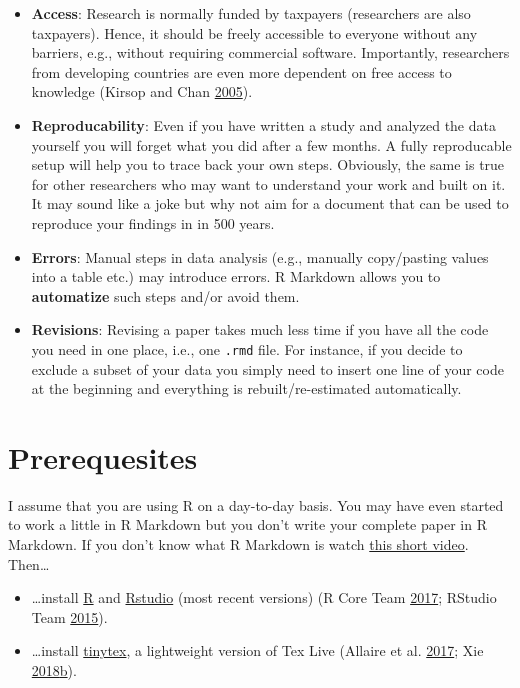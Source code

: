\documentclass[12pt,]{article}
\providecommand{\tightlist}{%
  \setlength{\itemsep}{0pt}\setlength{\parskip}{0pt}}
\theoremstyle{definition}
\theoremstyle{definition}
\theoremstyle{definition}
\theoremstyle{remark}
\begin{document}
\begin{itemize}
\tightlist
\item
  \textbf{Access}: Research is normally funded by taxpayers (researchers
  are also taxpayers). Hence, it should be freely accessible to everyone
  without any barriers, e.g., without requiring commercial software.
  Importantly, researchers from developing countries are even more
  dependent on free access to knowledge (Kirsop and Chan
  \protect\hyperlink{ref-Kirsop2005-ro}{2005}).
\item
  \textbf{Reproducability}: Even if you have written a study and
  analyzed the data yourself you will forget what you did after a few
  months. A fully reproducable setup will help you to trace back your
  own steps. Obviously, the same is true for other researchers who may
  want to understand your work and built on it. It may sound like a joke
  but why not aim for a document that can be used to reproduce your
  findings in in 500 years.
\item
  \textbf{Errors}: Manual steps in data analysis (e.g., manually
  copy/pasting values into a table etc.) may introduce errors. R
  Markdown allows you to \textbf{automatize} such steps and/or avoid
  them.
\item
  \textbf{Revisions}: Revising a paper takes much less time if you have
  all the code you need in one place, i.e., one \texttt{.rmd} file. For
  instance, if you decide to exclude a subset of your data you simply
  need to insert one line of your code at the beginning and everything
  is rebuilt/re-estimated automatically.
\end{itemize}

\section{Prerequesites}\label{prerequesites}

I assume that you are using R on a day-to-day basis. You may have even
started to work a little in R Markdown but you don't write your complete
paper in R Markdown. If you don't know what R Markdown is watch
\href{https://vimeo.com/178485416}{this short video}. Then\ldots{}

\begin{itemize}
\tightlist
\item
  \ldots{}install \href{https://www.r-project.org/}{R} and
  \href{https://www.rstudio.com/}{Rstudio} (most recent versions) (R
  Core Team \protect\hyperlink{ref-R2017}{2017}; RStudio Team
  \protect\hyperlink{ref-Rstudio2015}{2015}).
\item
  \ldots{}install \href{https://yihui.name/tinytex/}{tinytex}, a
  lightweight version of Tex Live (Allaire et al.
  \protect\hyperlink{ref-markdown2017}{2017}; Xie
  \protect\hyperlink{ref-tinytex}{2018}\protect\hyperlink{ref-tinytex}{b}).
\end{itemize}
\end{document}

